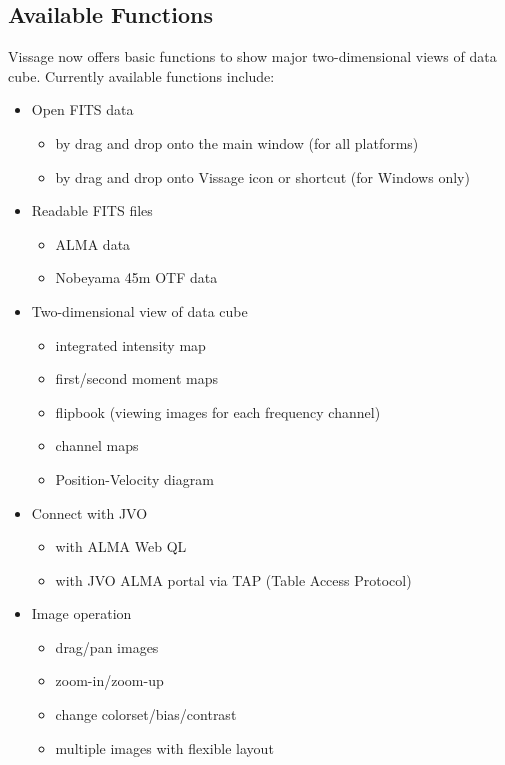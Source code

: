 \subsection{Available Functions}
Vissage now offers basic functions to show major two-dimensional views of 
data cube. Currently available functions include:
\begin{itemize}
  \item Open FITS data
    \begin{itemize}
      \item by drag and drop onto the main window (for all platforms)
      \item by drag and drop onto Vissage icon or shortcut (for Windows only)
    \end{itemize}
  \item Readable FITS files
    \begin{itemize}
      \item ALMA data
      \item Nobeyama 45m OTF data
    \end{itemize}
  \item Two-dimensional view of data cube
    \begin{itemize}
      \item integrated intensity map
      \item first/second moment maps
      \item flipbook (viewing images for each frequency channel)
      \item channel maps
      \item Position-Velocity diagram
    \end{itemize}
  \item Connect with JVO
    \begin{itemize}
      \item with ALMA Web QL
      \item with JVO ALMA portal via TAP (Table Access Protocol)
    \end{itemize}
  \item Image operation
    \begin{itemize}
      \item drag/pan images
      \item zoom-in/zoom-up
      \item change colorset/bias/contrast
      \item multiple images with flexible layout
    \end{itemize}
\end{itemize}

